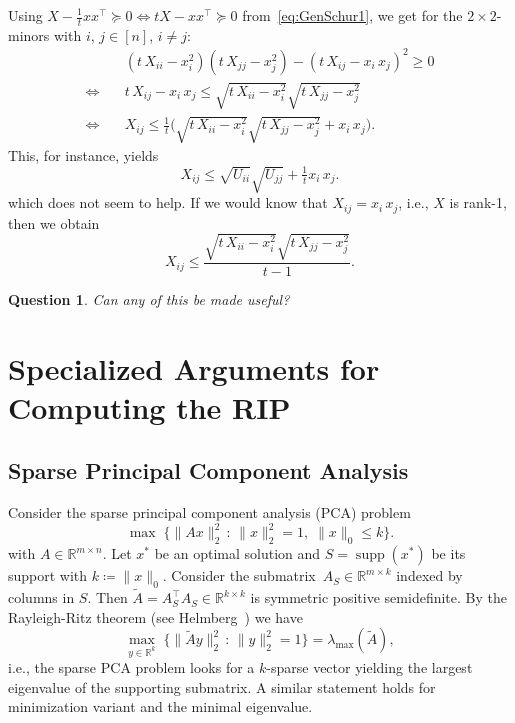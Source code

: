 \documentclass[10pt, a4paper]{article}
\DeclareMathOperator{\supp}{supp}
\newcommand{\suchthat}{\,:\,}
\newcommand{\define}{\coloneqq}
\newcommand{\Norm}[2]{\lVert{#1}\rVert_{#2}}
\newcommand{\T}{^{\top}}
\newcommand{\R}{\mathds{R}}
\newtheorem{question}[theorem]{Question}
\begin{document}
Using
$X - \tfrac{1}{t} x x\T \succeq 0 \Leftrightarrow t X - x x\T \succeq 0$
from~\eqref{eq:GenSchur1}, we get for the $2 \times 2$-minors with $i$,
$j \in [n]$, $i \neq j$:
\begin{align*}
  & (t\, X_{ii} - x_i^2) (t\, X_{jj} - x_j^2) -  (t\, X_{ij} - x_i\, x_j)^2 \geq 0
  \\
  \Leftrightarrow\quad & t \, X_{ij} - x_i\, x_j \leq \sqrt{t\, X_{ii} - x_i^2} \sqrt{t\, X_{jj} - x_j^2}
  \\
  \Leftrightarrow\quad & X_{ij} \leq \frac{1}{t} \bigg(\sqrt{t\, X_{ii} - x_i^2}
                         \sqrt{t\, X_{jj} - x_j^2} + x_i\, x_j\bigg).
\end{align*}
This, for instance, yields
\[
  X_{ij} \leq \sqrt{U_{ii}} \sqrt{U_{jj}} + \tfrac{1}{t} x_i\, x_j.
\]
which does not seem to help. If we would know that $X_{ij} = x_i\, x_j$,
i.e., $X$ is rank-1, then we obtain
\[
  X_{ij} \leq \frac{\sqrt{t\, X_{ii} - x_i^2} \sqrt{t\, X_{jj} - x_j^2}}{t-1}.
\]


\begin{question}
  Can any of this be made useful?
\end{question}


\section{Specialized Arguments for Computing the RIP}

\subsection{Sparse Principal Component Analysis}

Consider the sparse principal component analysis (PCA) problem
\[
  \max\; \{\Norm{Ax}{2}^2 \suchthat \Norm{x}{2}^2 = 1,\; \Norm{x}{0} \leq k\}. 
\]
with $A \in \R^{m \times n}$.  Let $x^*$ be an optimal solution and
$S = \supp(x^*)$ be its support with $k \define \Norm{x}{0}$. Consider the
submatrix~$A_S \in \R^{m \times k}$ indexed by columns in $S$. Then
$\tilde{A} = A_S\T A_S^{\phantom{T}} \in \R^{k \times k}$ is symmetric positive
semidefinite. By the Rayleigh-Ritz theorem (see
Helmberg~\cite[Thm.~A.0.4]{Hel00}) we have
\[
  \max_{y \in \R^k} \; \{\Norm{\tilde{A}y}{2}^2 \suchthat \Norm{y}{2}^2 =
  1\} = \lambda_{\max}(\tilde{A}),
\]
i.e., the sparse PCA problem looks for a $k$-sparse vector yielding the
largest eigenvalue of the supporting submatrix. A similar statement holds
for minimization variant and the minimal eigenvalue.
\end{document}
